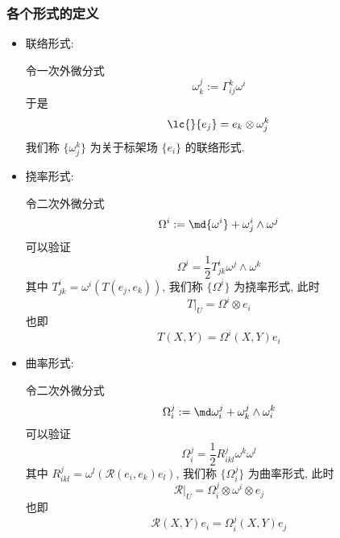     \subsubsection{各个形式的定义}
        \begin{itemize}
            \item 联络形式:
            
            令一次外微分式
            \begin{equation*}
                \omega_{k}^{j} := \Gamma_{ij}^{k}\omega^i
            \end{equation*}
            于是
            \begin{equation*}
                \lc{}{e_j} = e_k\otimes\omega_{j}^{k}
            \end{equation*}
            我们称 $\{\omega_{j}^{k}\}$ 为关于标架场 $\{e_i\}$ 的联络形式. 
            \item 挠率形式:
            
            令二次外微分式
            \begin{equation*}
                \Omega^i := \md{\omega^i} + \omega^{i}_{j}\wedge\omega^j
            \end{equation*}
            可以验证
            \begin{equation*}
                \Omega^i = \frac{1}{2}T_{jk}^{i}\omega^j\wedge\omega^k
            \end{equation*}
            其中 $T_{jk}^{i}=\omega^i\left(T\left(e_j,e_k\right)\right)$, 我们称 $\{\Omega^i\}$ 为挠率形式, 此时
            \begin{equation*}
                T\big|_U = \Omega^i\otimes e_i
            \end{equation*}
            也即
            \begin{equation*}
                T(X,Y) = \Omega^i(X,Y)e_i
            \end{equation*}
            \item 曲率形式:
            
            令二次外微分式
            \begin{equation*}
                \Omega^{j}_{i} := \md\omega^{j}_{i} + \omega^{j}_{k}\wedge\omega^{k}_{i}
            \end{equation*}
            可以验证
            \begin{equation*}
                \Omega^{j}_{i} = \frac{1}{2}R_{ikl}^{j}\omega^k\omega^l
            \end{equation*}
            其中 $R_{ikl}^{j} = \omega^l\left(\mathcal{R}(e_i,e_k)e_l\right)$, 我们称 $\{\Omega^j_i\}$ 为曲率形式, 此时
            \begin{equation*}
                \mathcal{R}\big|_U = \Omega^j_i\otimes\omega^i\otimes e_j
            \end{equation*}
            也即
            \begin{equation*}
                \mathcal{R}(X,Y)e_i = \Omega^j_i(X,Y)e_j
            \end{equation*}
        \end{itemize}
